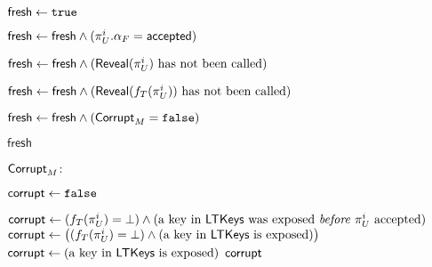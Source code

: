 \begin{figure}
{\begin{minipage}[t]{1\textwidth}
\begin{algorithmic}[1]
			
			\State 
		
			\State {}
			\State $\mathsf{fresh} \gets \mathtt{true}$
			
			\State {}
			\State $\mathsf{fresh} \gets \mathsf{fresh} \land (\oracle[U][i].\runstate_F = \accepted)$
			
			\State {}
			\State $\mathsf{fresh} \gets \mathsf{fresh} \land (\Reveal(\oracle[U][i]) \text{ has not been called})$ \label{code:fresh:reveal_U}
			
			\State {}
			\State $\mathsf{fresh} \gets \mathsf{fresh} \land (\Reveal(f_T(\oracle[U][i])) \text{ has not been called})$ \label{code:fresh:reveal_partner}
			
			\State {}
			\State $\mathsf{fresh} \gets \mathsf{fresh} \land (\mathsf{Corrupt}_M = \mathtt{false})$ \label{code:fresh:corrupt}
			
			\State
			\State \Return $\mathsf{fresh}$
		
			\Statex
			

		
		
		
		
		\end{algorithmic}
		
		\underline{$\mathsf{Corrupt}_M$}:
		\begin{algorithmic}[1]
		
			\State $\mathsf{corrupt} \gets \mathtt{false}$
		
				\State $\corrupted \gets 
				(f_T(\oracle[U][i]) = \bot) \land (\text{a key in } \mathsf{LTKeys} \text{ was exposed \emph{before} } \oracle[U][i] \text{ accepted})$  \label{code:fresh:corrupt:AKEfs}
			\EndIf
				\State $\corrupted \gets  
				\left( (f_T(\oracle[U][i]) = \bot) \land (\text{a key in } \mathsf{LTKeys} \text{ is exposed}) \right)$ \label{code:fresh:corrupt:AKEwfs}
			\EndIf
				\State $\mathsf{corrupt} \gets \left( \text{a key in } \mathsf{LTKeys} \text{ is exposed} \right)$ \label{code:fresh:corrupt:AKEnfs}
			\EndIf
			\State \Return $\mathsf{corrupt}$
		\end{algorithmic}
	\end{minipage}
}



\end{figure}
